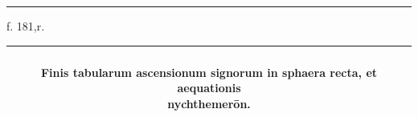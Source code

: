\documentclass[11pt]{article}
\renewcommand{\arraystretch}{1.18}
\begin{document}
\clearpage
\noindent{}
\par\vspace{-1mm}\noindent\rule{\textwidth}{.4pt}\par\vspace{1mm}
\begin{center}{\small f. 181,r.}\end{center}\vspace{-3mm}
\begin{center}\setlength{\tabcolsep}{3pt}\renewcommand{\arraystretch}{1.02}\begin{tabular}{||c|>{\centering\arraybackslash}p{27mm}|>{\centering\arraybackslash}p{25mm}||>{\centering\arraybackslash}p{27mm}|>{\centering\arraybackslash}p{25mm}||>{\centering\arraybackslash}p{27mm}|>{\centering\arraybackslash}p{25mm}||}\hline
\multicolumn{7}{||c||}{\parbox{170mm}{\centering{}\\\textbf{Finis tabularum ascensionum signorum in sphaera recta, et aequationis}\\\textbf{nychthemerōn.}\vspace{1mm}}} \\ \hline

\end{tabular}
\end{center}
\end{document}
